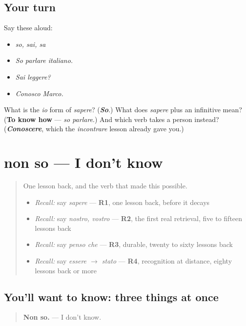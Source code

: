 \subsection*{Your turn}
Say these aloud:

\begin{itemize}
\raggedright
  \item \emph{so, sai, sa}
  \item \emph{So parlare italiano.}
  \item \emph{Sai leggere?}
  \item \emph{Conosco Marco.}
\end{itemize}

\begin{tcolorbox}[breakable,colback=teal!4,colframe=teal!35!black,title={Before you move on}]
What is the \emph{io} form of \emph{sapere}? (\emph{\textbf{So}}.) What does \emph{sapere} plus an infinitive mean? (\textbf{To know how} — \emph{so parlare}.) And which verb takes a person instead? (\emph{\textbf{Conoscere}}, which the \emph{incontrare} lesson already gave you.)
\end{tcolorbox}
\section[non so]{non so — I don't know}

\label{lesson:IT-C35-non-so}



\begin{quote}
One lesson back, and the verb that made this possible.

\begin{itemize}
\raggedright
  \item \emph{Recall:} say \emph{sapere} — \textbf{R1}, one lesson back, before it decays
  \item \emph{Recall:} say \emph{nostro, vostro} — \textbf{R2}, the first real retrieval, five to fifteen lessons back
  \item \emph{Recall:} say \emph{penso che} — \textbf{R3}, durable, twenty to sixty lessons back
  \item \emph{Recall:} say \emph{essere $\to$ stato} — \textbf{R4}, recognition at distance, eighty lessons back or more
\end{itemize}
\end{quote}

\subsection*{You'll want to know: three things at once}
\begin{quote}
\textbf{Non so.} — I don't know.
\end{quote}

